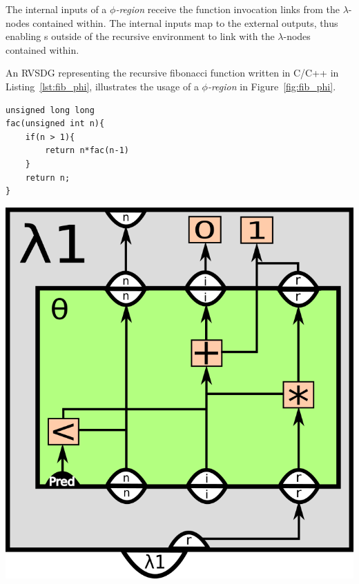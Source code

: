 \begin{itemize}
The internal inputs of a \textit{$\phi$-region} receive the function invocation links from the
$\lambda$-nodes contained within. The internal inputs map to the external
outputs, thus enabling \applyNode s outside of the recursive environment to link
with the $\lambda$-nodes contained within.

An RVSDG representing the recursive fibonacci function written in C/C++ in
Listing~\ref{lst:fib_phi}, illustrates the usage of a \textit{$\phi$-region} in
Figure~\ref{fig:fib_phi}.

\begin{centering}
	\noindent\begin{minipage}{0.37\textwidth}
		\begin{CenteredBox}
		\begin{lstlisting}[label={lst:recursive_factorial_func_ex},
style=minipage_customcpp]
unsigned long long
fac(unsigned int n){
	if(n > 1){
		return n*fac(n-1)
	}
	return n;
}
		\end{lstlisting}
		\end{CenteredBox}
	\end{minipage}
	\noindent\begin{minipage}{0.55\textwidth}
		\captionsetup{type=figure}
		\includegraphics[width=\textwidth]{figures/iterative_factorial_func_ex}
	\end{minipage}
	\label{fig:recursive_factorial_func_ex}
\end{centering}

\end{itemize}
